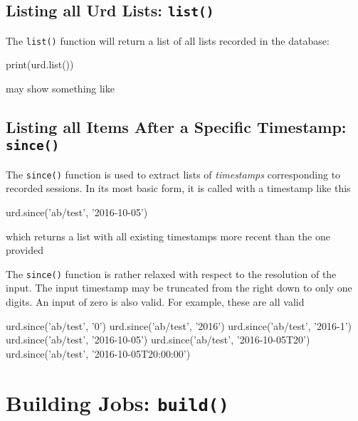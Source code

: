 \subsection{Listing all Urd Lists:  \texttt{list()}}
The \texttt{list()} function will return a list of all lists recorded in
the database:
\begin{python}
print(urd.list())
\end{python}
may show something like
\begin{shell}
\end{shell}



\subsection{Listing all Items After a Specific Timestamp:  \texttt{since()}}
The \texttt{since()} function is used to extract lists
of \textsl{timestamps} corresponding to recorded sessions.  In its
most basic form, it is called with a timestamp like this
\begin{python}
urd.since('ab/test', '2016-10-05')
\end{python}
which returns a list with all existing timestamps more recent than the
one provided
\begin{shell}
['2016-10-06', '2016-10-07', '2016-10-08', '2016-10-09', '2016-10-09T20']
\end{shell}
The \texttt{since()} function is rather relaxed with respect to the
resolution of the input.  The input timestamp may be truncated from
the right down to only one digits.  An input of zero is also valid.
For example, these are all valid
\begin{python}
urd.since('ab/test', '0')
urd.since('ab/test', '2016')
urd.since('ab/test', '2016-1')
urd.since('ab/test', '2016-10-05')
urd.since('ab/test', '2016-10-05T20')
urd.since('ab/test', '2016-10-05T20:00:00')
\end{python}





\section{Building Jobs: \texttt{build()}}
\label{sec:urd_build}

